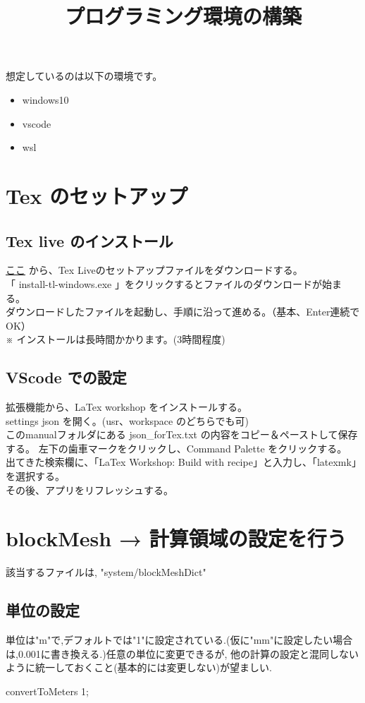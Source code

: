 \documentclass[a4paper]{jsarticle}
\author{}
\title{プログラミング環境の構築}
\date{}
\begin{document}
\maketitle

想定しているのは以下の環境です。
\begin{itemize}
    \item windows10
    \item vscode
    \item wsl
\end{itemize}

\section{\large Tex のセットアップ}
\subsection{Tex live のインストール}
\textcolor{blue}{\href{http://www.tug.org/texlive/acquire-netinstall.html}{ここ}} から、Tex Liveのセットアップファイルをダウンロードする。\\
「 install-tl-windows.exe 」をクリックするとファイルのダウンロードが始まる。\\
ダウンロードしたファイルを起動し、手順に沿って進める。（基本、Enter連続でOK）\\
※ インストールは長時間かかります。(3時間程度)
\subsection{VScode での設定}
拡張機能から、LaTex workshop をインストールする。\\
settings json を開く。(usr、workspace のどちらでも可)\\
このmanualフォルダにある json\_forTex.txt の内容をコピー＆ペーストして保存する。
左下の歯車マークをクリックし、Command Palette をクリックする。\\
出てきた検索欄に、「LaTex Workshop: Build with recipe」と入力し、「latexmk」を選択する。\\
その後、アプリをリフレッシュする。
\section{\large blockMesh → 計算領域の設定を行う}
該当するファイルは, "system/blockMeshDict"
\subsection{単位の設定}
単位は"m"で,デフォルトでは"1"に設定されている.(仮に"mm"に設定したい場合は,0.001に書き換える.)任意の単位に変更できるが,
他の計算の設定と混同しないように統一しておくこと(基本的には変更しない)が望ましい.
\begin{framed}
    \begin{center}
        convertToMeters 1;
    \end{center}
\end{framed}
\end{document}

